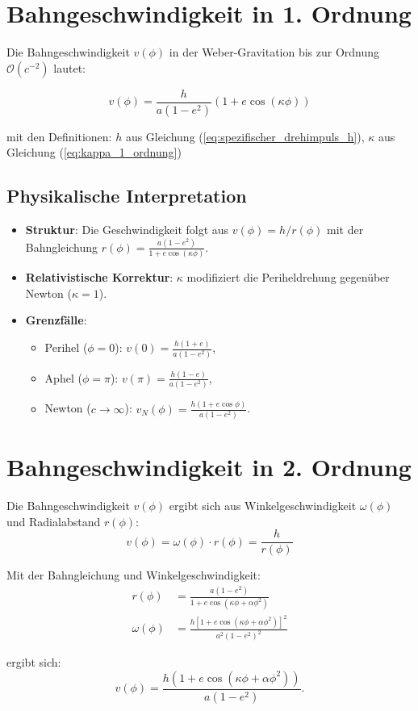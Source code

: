 \newpage
\section{Bahngeschwindigkeit in 1. Ordnung}
Die Bahngeschwindigkeit \(v(\phi)\) in der Weber-Gravitation bis zur Ordnung \(\mathcal{O}(c^{-2})\) lautet:

\begin{equation}
v(\phi) = \frac{h}{a(1 - e^2)} \left(1 + e \cos\left(\kappa\phi\right)\right)
\end{equation}

\noindent mit den Definitionen:
$h$ aus Gleichung (\ref{eq:spezifischer_drehimpuls_h}), $\kappa$ aus Gleichung (\ref{eq:kappa_1_ordnung})

\subsection*{Physikalische Interpretation}
\begin{itemize}
    \item \textbf{Struktur}: Die Geschwindigkeit folgt aus \(v(\phi) = h/r(\phi)\) mit der Bahngleichung \(r(\phi) = \frac{a(1 - e^2)}{1 + e \cos(\kappa\phi)}\).
    \item \textbf{Relativistische Korrektur}: \(\kappa\) modifiziert die Periheldrehung gegenüber Newton (\(\kappa = 1\)).
    \item \textbf{Grenzfälle}:
        \begin{itemize}
            \item Perihel (\(\phi = 0\)): \(v(0) = \frac{h(1 + e)}{a(1 - e^2)}\),
            \item Aphel (\(\phi = \pi\)): \(v(\pi) = \frac{h(1 - e)}{a(1 - e^2)}\),
            \item Newton (\(c \to \infty\)): \(v_N(\phi) = \frac{h(1 + e \cos\phi)}{a(1 - e^2)}\).
        \end{itemize}
\end{itemize}

\section{Bahngeschwindigkeit in 2. Ordnung}
Die Bahngeschwindigkeit $v(\phi)$ ergibt sich aus Winkelgeschwindigkeit $\omega(\phi)$ und Radialabstand $r(\phi)$:
\begin{equation}
v(\phi) = \omega(\phi) \cdot r(\phi) = \frac{h}{r(\phi)}
\end{equation}

Mit der Bahngleichung und Winkelgeschwindigkeit:
\begin{align}
r(\phi) &= \frac{a(1-e^2)}{1 + e\cos\left(\kappa\phi + \alpha\phi^2\right)}\\
\omega(\phi) &= \frac{h[1 + e\cos(\kappa\phi + \alpha\phi^2)]^2}{a^2(1-e^2)^2}
\end{align}

ergibt sich:
\begin{equation}
v(\phi) = \frac{h \left(1 + e\cos(\kappa\phi + \alpha\phi^2)\right)}{a(1 - e^2)}.
\end{equation}
